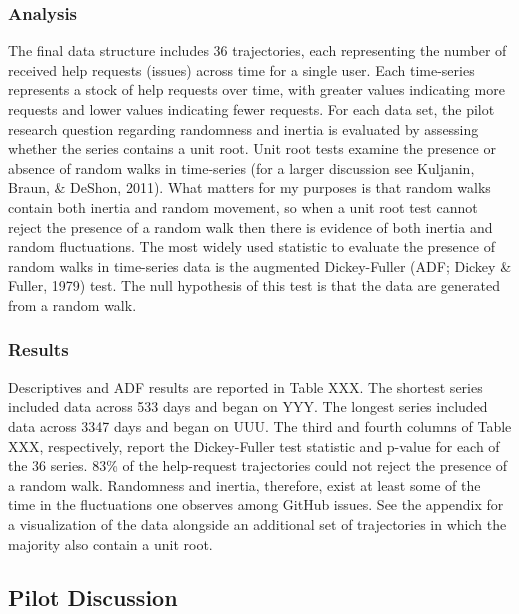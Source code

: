 \documentclass[english,,man]{apa6}
\begin{document}
\hypertarget{analysis}{%
\subsubsection{Analysis}\label{analysis}}

The final data structure includes 36 trajectories, each representing the number of received help requests (issues) across time for a single user. Each time-series represents a stock of help requests over time, with greater values indicating more requests and lower values indicating fewer requests. For each data set, the pilot research question regarding randomness and inertia is evaluated by assessing whether the series contains a unit root. Unit root tests examine the presence or absence of random walks in time-series (for a larger discussion see Kuljanin, Braun, \& DeShon, 2011). What matters for my purposes is that random walks contain both inertia and random movement, so when a unit root test cannot reject the presence of a random walk then there is evidence of both inertia and random fluctuations. The most widely used statistic to evaluate the presence of random walks in time-series data is the augmented Dickey-Fuller (ADF; Dickey \& Fuller, 1979) test. The null hypothesis of this test is that the data are generated from a random walk.

\hypertarget{results}{%
\subsubsection{Results}\label{results}}

Descriptives and ADF results are reported in Table XXX. The shortest series included data across 533 days and began on YYY. The longest series included data across 3347 days and began on UUU. The third and fourth columns of Table XXX, respectively, report the Dickey-Fuller test statistic and p-value for each of the 36 series. 83\% of the help-request trajectories could not reject the presence of a random walk. Randomness and inertia, therefore, exist at least some of the time in the fluctuations one observes among GitHub issues. See the appendix for a visualization of the data alongside an additional set of trajectories in which the majority also contain a unit root.

\hypertarget{pilot-discussion}{%
\subsection{Pilot Discussion}\label{pilot-discussion}}
\end{document}
